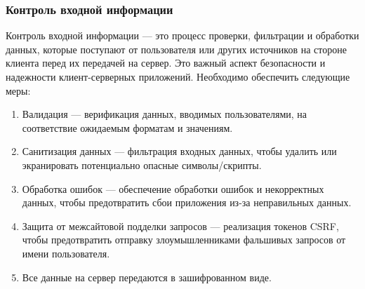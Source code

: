 \documentclass[a4paper,14pt]{extarticle}
\begin{document}
\begin{spacing}{1.5}
\subsubsection{Контроль входной информации}
\hspace{\parindent} Контроль входной информации --- это процесс проверки, фильтрации и обработки данных, которые поступают от пользователя или других источников на стороне клиента перед их передачей на сервер. Это важный аспект безопасности и надежности клиент-серверных приложений. Необходимо обеспечить следующие меры:
\begin{enumerate}[label*=\arabic*.]
    \item Валидация --- верификация данных, вводимых пользователями, на соответствие ожидаемым форматам и значениям.
    \item Санитизация данных --- фильтрация входных данных, чтобы удалить или экранировать потенциально опасные символы/скрипты.
    \item Обработка ошибок --- обеспечение обработки ошибок и некорректных данных, чтобы предотвратить сбои приложения из-за неправильных данных.
    \item Защита от межсайтовой подделки запросов --- реализация токенов CSRF, чтобы предотвратить отправку злоумышленниками фальшивых запросов от имени пользователя.
    \item Все данные на сервер передаются в зашифрованном виде. 
\end{enumerate}


\end{spacing}
\end{document}
